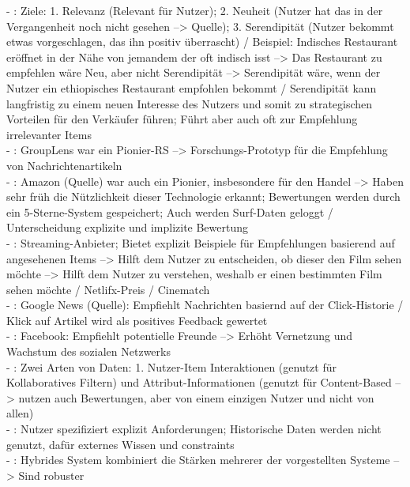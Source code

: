 - \cite[S. 4]{recommenderSystems:2016}: Ziele: 1. Relevanz (Relevant für Nutzer); 2. Neuheit (Nutzer hat das in der Vergangenheit noch nicht gesehen --> Quelle); 3. Serendipität (Nutzer bekommt etwas vorgeschlagen, das ihn positiv überrascht) / Beispiel: Indisches Restaurant eröffnet in der Nähe von jemandem der oft indisch isst --> Das Restaurant zu empfehlen wäre Neu, aber nicht Serendipität --> Serendipität wäre, wenn der Nutzer ein ethiopisches Restaurant empfohlen bekommt / Serendipität kann langfristig zu einem neuen Interesse des Nutzers und somit zu strategischen Vorteilen für den Verkäufer führen; Führt aber auch oft zur Empfehlung irrelevanter Items\\
- \cite[S. 5]{recommenderSystems:2016}: GroupLens war ein Pionier-RS --> Forschungs-Prototyp für die Empfehlung von Nachrichtenartikeln\\
- \cite[S. 5]{recommenderSystems:2016}: Amazon (Quelle) war auch ein Pionier, insbesondere für den Handel --> Haben sehr früh die Nützlichkeit dieser Technologie erkannt; Bewertungen werden durch ein 5-Sterne-System gespeichert; Auch werden Surf-Daten geloggt / Unterscheidung explizite und implizite Bewertung \\
- \cite[S. 5f.]{recommenderSystems:2016}: Streaming-Anbieter; Bietet explizit Beispiele für Empfehlungen basierend auf angesehenen Items --> Hilft dem Nutzer zu entscheiden, ob dieser den Film sehen möchte --> Hilft dem Nutzer zu verstehen, weshalb er einen bestimmten Film sehen möchte / Netlifx-Preis / Cinematch\\
- \cite[S. 6]{recommenderSystems:2016}: Google News (Quelle): Empfiehlt Nachrichten basiernd auf der Click-Historie / Klick auf Artikel wird als positives Feedback gewertet \\
- \cite[S. 7]{recommenderSystems:2016}: Facebook: Empfiehlt potentielle Freunde --> Erhöht Vernetzung und Wachstum des sozialen Netzwerks\\
- \cite[S. 8]{recommenderSystems:2016}: Zwei Arten von Daten: 1. Nutzer-Item Interaktionen (genutzt für Kollaboratives Filtern) und Attribut-Informationen (genutzt für Content-Based --> nutzen auch Bewertungen, aber von einem einzigen Nutzer und nicht von allen)\\
- \cite[S. 8]{recommenderSystems:2016}: Nutzer spezifiziert explizit Anforderungen; Historische Daten werden nicht genutzt, dafür externes Wissen und constraints \\
- \cite[S. 8]{recommenderSystems:2016}: Hybrides System kombiniert die Stärken mehrerer der vorgestellten Systeme --> Sind robuster\\
